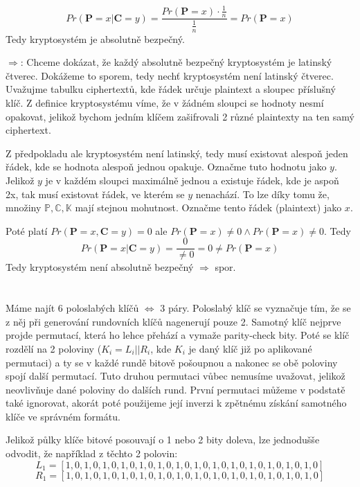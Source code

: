 \documentclass[12pt, a4paper]{article}
\begin{document}
\[
Pr(\mathbf{P}=x \vert \mathbf{C}=y) = \frac{Pr(\mathbf{P}=x) \cdot \frac{1}{n}}{\frac{1}{n}} = Pr(\mathbf{P}=x)
\]
Tedy kryptosystém je absolutně bezpečný.

$\Rightarrow$: Chceme dokázat, že každý absolutně bezpečný kryptosystém je latinský čtverec. Dokážeme to sporem, tedy nechť kryptosystém není latinský čtverec. Uvažujme tabulku ciphertextů, kde řádek určuje plaintext a sloupec příslušný klíč. Z definice kryptosystému víme, že v žádném sloupci se hodnoty nesmí opakovat, jelikož bychom jedním klíčem zašifrovali 2 různé plaintexty na ten samý ciphertext.

Z předpokladu ale kryptosystém není latinský, tedy musí existovat alespoň jeden řádek, kde se hodnota alespoň jednou opakuje. Označme tuto hodnotu jako $y$. Jelikož $y$ je v každém sloupci maximálně jednou a existuje řádek, kde je aspoň 2x, tak musí existovat řádek, ve kterém se $y$ nenachází. To lze díky tomu že, množiny $\mathbb{P}, \mathbb{C}, \mathbb{K}$ mají stejnou mohutnost. Označme tento řádek (plaintext) jako $x$.

Poté platí $Pr(\mathbf{P}=x, \mathbf{C}=y) = 0$ ale  $Pr(\mathbf{P}=x) \neq 0 \land Pr(\mathbf{P}=x) \neq 0$. Tedy
\[
Pr(\mathbf{P}=x \vert \mathbf{C}=y) = \frac{0}{\neq 0} = 0 \neq Pr(\mathbf{P}=x)
\]
Tedy kryptosystém není absolutně bezpečný $\Rightarrow$ spor.

\section{}
Máme najít 6 poloslabých klíčů $\Leftrightarrow$ 3 páry. Poloslabý klíč se vyznačuje tím, že se z něj při generování rundovních klíčů nagenerují pouze 2. Samotný klíč nejprve projde permutací, která ho lehce přehází a vymaže parity-check bity. Poté se klíč rozdělí na 2 poloviny ($K_i = L_i || R_i$, kde $K_i$ je daný klíč již po aplikované permutaci) a ty se v každé rundě bitově pošoupnou a nakonec se obě poloviny spojí další permutací. Tuto druhou permutaci vůbec nemusíme uvažovat, jelikož neovlivňuje dané poloviny do dalších rund. První permutaci můžeme v podstatě také ignorovat, akorát poté použijeme její inverzi k zpětnému získání samotného klíče ve správném formátu.

Jelikož půlky klíče bitové posouvají o 1 nebo 2 bity doleva, lze jednodušše odvodit, že například z těchto 2 polovin:
$$L_1 = [1, 0, 1, 0, 1, 0, 1, 0, 1, 0, 1, 0, 1, 0, 1, 0, 1, 0, 1, 0, 1, 0, 1, 0, 1, 0, 1, 0]$$
$$R_1 = [1, 0, 1, 0, 1, 0, 1, 0, 1, 0, 1, 0, 1, 0, 1, 0, 1, 0, 1, 0, 1, 0, 1, 0, 1, 0, 1, 0]$$
\end{document}
